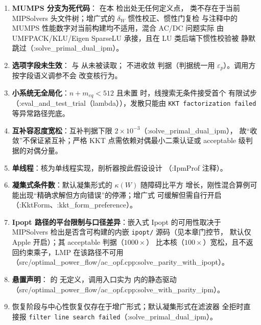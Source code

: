 \begin{enumerate}
  \item \textbf{MUMPS 分支为死代码}： 在本
        检出处无任何定义点， 类不存在于当前
        MIPSolvers 头文件树；增广式的 $\delta_W$ 惯性校正、惯性门复检
        与注释中的 MUMPS 性能数字对当前构建均不适用，混合 AC/DC 问题实际
        由 UMFPACK/KLU/Eigen SparseLU 承接，且在 LU 类后端下惯性校验被
        静默跳过（:solve\_primal\_dual\_ipm）。
  \item \textbf{选项字段未生效}：
        与  从未被读取； 不进收敛
        判据（判据统一用 $\varepsilon_p$）。调用方按字段语义调参不会
        改变核行为。
  \item \textbf{小系统无全局化}：$n+m_{eq}<512$ 且未置
         时，线搜索无条件接受首个
        有限试步（:eval\_and\_test\_trial（lambda）），发散只能由 \texttt{KKT factorization failed}
        等异常路径兜底。
  \item \textbf{互补容忍度宽松}：互补判据下限 $2\times10^{-3}$（:solve\_primal\_dual\_ipm），
        故“收敛”不保证紧互补；严格 KKT 点需依赖对偶最小二乘认证或
        acceptable 级判据的对偶分量。
  \item \textbf{单线程}：核为单线程实现，剖析器按此假设设计
        （:IpmProf 注释）。
  \item \textbf{凝集式条件数}：默认凝集形式的 $\kappa(W)$ 随障碍比平方
        增长，刚性混合算例可能出现“精确求解但方向错误”的停滞；增广式
        可缓解但需自行开启（:KktForm、:kkt\_form\_preference）。
  \item \textbf{Ipopt 路径的平台限制与口径差异}：嵌入式 Ipopt 的可用性取决于
        MIPSolvers 检出是否含可构建的内嵌 \texttt{ipopt/} 源码（见本章门控节，
        默认仅 Apple 开启）；其 acceptable 判据（$1000\times$）
        比本核（$100\times$）宽松，且不返回约束乘子，LMP 在该路径不可用
        （src/optimal\_power\_flow/ac\_opf.cpp:solve\_parity\_with\_ipopt）。
  \item \textbf{悬置声明}： 的
         无定义，调用入口实为
         内的静态驱动（src/optimal\_power\_flow/ac\_opf.cpp:solve\_with\_parity\_ipm）。
  \item 恢复阶段与中心性恢复仅存在于增广形式；默认凝集形式在滤波器
        全拒时直接报 \texttt{filter line search failed}（:solve\_primal\_dual\_ipm）。
\end{enumerate}
